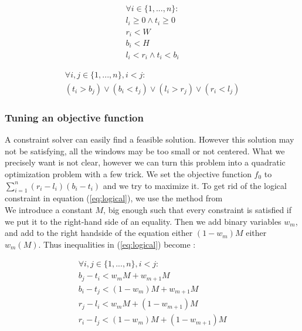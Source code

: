 \documentclass{acmtog}
\begin{document}
\begin{equation}
\begin{split}
\forall  i \in  \{1, ... ,n\}  :\\
l_i \geq 0 \wedge t_i \geq 0 \\
 r_i < W \\
 b_i  < H  \\
l_i < r_i \wedge t_i < b_i
\end{split}
\end{equation}


\begin{equation}
\begin{split}
\forall i, j \in \{1,..., n\}, i < j : \\
(t_i > b_j) \lor (b_i < t_j) \lor (l_i > r_j) \lor (r_i < l_j)
\end{split}
\label{eq:logical}
\end{equation}

\subsubsection{Tuning an objective function}
A constraint solver can easily find a feasible solution. However this solution may not be satisfying, all the windows may be too small or not centered. What we precisely want is not clear, however we can turn this problem into a quadratic optimization problem with a few trick. We set the objective function $f_0$  to $\sum_{i=1}^{n}{(r_i-l_i)(b_i-t_i)}$ and we try to maximize it.  To get rid of the logical constraint in equation (\ref{eq:logical}), we use the method from %
\\ We introduce a constant $M$, big enough such that every constraint is satisfied if we put it to the right-hand side of an equality. Then we add binary variables $w_m$, and add to the right handside of the equation either $(1-w_m) M$ either  $w_m(M)$. Thus inequalities in (\ref{eq:logical}) become : 

\begin{equation}
\begin{split}
\forall i, j \in \{1,..., n\}, i < j : \\
b_j - t_i < w_mM + w_{m+1}M \\
 b_i - t_j < (1-w_m)M + w_{m+1}M \\
r_j - l_i < w_mM + (1-w_{m+1})M \\
r_i - l_j < (1-w_m)M + (1-w_{m+1})M\\
\end{split}
\end{equation}
\end{document}
